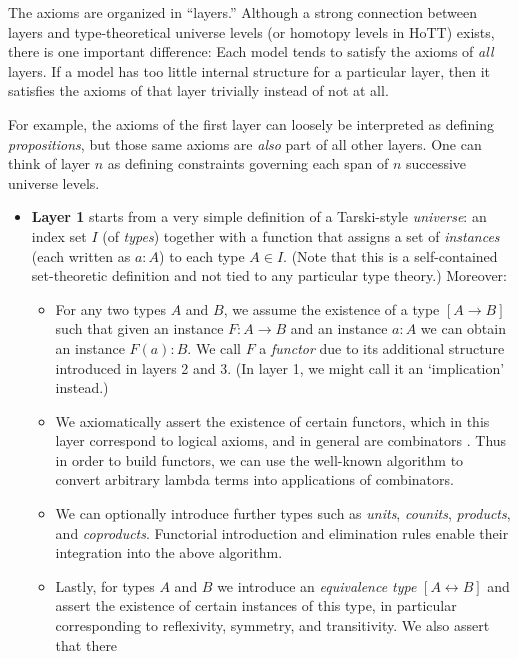 \documentclass[a4paper]{article}
\theoremstyle{definition}
\theoremstyle{remark}
\newcommand{\defn}{\emph}
\begin{document}
The axioms are organized in ``layers.'' Although a strong connection between layers and
type-theoretical universe levels (or homotopy levels in HoTT) exists, there is one important
difference: Each model tends to satisfy the axioms of \emph{all} layers. If a model has too little
internal structure for a particular layer, then it satisfies the axioms of that layer trivially
instead of not at all.

For example, the axioms of the first layer can loosely be interpreted as defining
\defn{propositions}, but those same axioms are \emph{also} part of all other layers. One can think
of layer $n$ as defining constraints governing each span of $n$ successive universe levels.

\begin{itemize}
  \item \textbf{Layer 1} starts from a very simple definition of a Tarski-style \defn{universe}:
  an index set $I$ (of \defn{types}) together with a function that assigns a set of \defn{instances}
  (each written as $a : A$) to each type $A \in I.$ (Note that this is a self-contained
  set-theoretic definition and not tied to any particular type theory.) Moreover:
  \begin{itemize}
    \item For any two types $A$ and $B$, we assume the existence of a type $[A \to B]$ such that
    given an instance $F : A \to B$ and an instance $a : A$ we can obtain an instance $F(a) : B.$
    We call $F$ a \defn{functor} due to its additional structure introduced in layers 2 and 3.
    (In layer 1, we might call it an `implication' instead.)
    \item We axiomatically assert the existence of certain functors, which in this layer correspond
    to logical axioms, and in general are combinators \cite{combinators}. Thus in order to build
    functors, we can use the well-known algorithm to convert arbitrary lambda terms into
    applications of combinators.
    \item We can optionally introduce further types such as \defn{units}, \defn{counits},
    \defn{products}, and \defn{coproducts}. Functorial introduction and elimination rules enable
    their integration into the above algorithm.
    \item Lastly, for types $A$ and $B$ we introduce an \defn{equivalence type}
    $[A \leftrightarrow B]$ and assert the existence of certain instances of this type, in
    particular corresponding to reflexivity, symmetry, and transitivity. We also assert that there

\end{itemize}
\end{itemize}
\end{document}
